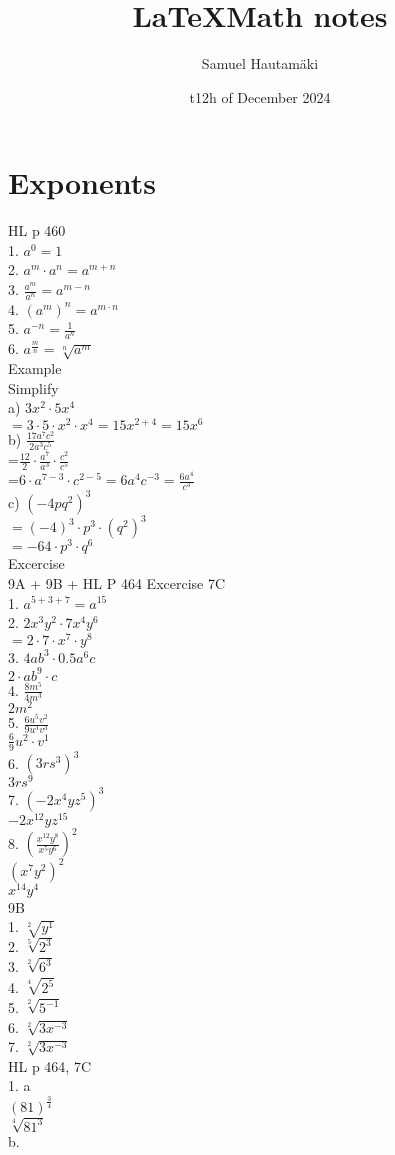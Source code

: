 \documentclass{article}
\title{\LaTeX Math notes}
\author{Samuel Hautamäki}
\date{t12h of December 2024}
\begin{document}
  \maketitle
   
  \section{Exponents}
  HL p 460\\
  1. $a^0=1$\\
  2. $a^m\cdot a^n=a^{m+n}$\\
  3. $\frac{a^m}{a^n}=a^{m-n}$\\
  4. $(a^m)^n=a^{m\cdot n}$\\
  5. $a^{-n}=\frac{1}{a^n}$\\
  6. $a^{\frac{m}{n}}=\sqrt[n]{a^m}$\\
  Example\\
  Simplify\\
  a) $3x^2\cdot 5x^4$\\
  $=3\cdot5\cdot x^2\cdot x^4=15x^{2+4}=15x^6$\\
  b) $\frac{17a^7c^2}{2a^3c^5}$\\
  =$\frac{12}{2}\cdot\frac{a^7}{a^3}\cdot\frac{c^2}{c^5}$\\
  =$6\cdot a^{7-3}\cdot c^{2-5}=6a^4c^{-3}=\frac{6a^4}{c^3}$\\
  c) $(-4pq^2)^3$\\
  $=(-4)^3\cdot p^3\cdot (q^2)^3$\\
  $=-64\cdot p^3\cdot q^6$\\
  Excercise \\
  9A + 9B + HL P 464 Excercise 7C\\
  1. $a^{5+3+7}=a^{15}$\\
  2. $2x^3y^2\cdot 7x^4y^6$\\
  $=2\cdot7\cdot x^7\cdot y^8$\\
  3. $4ab^3\cdot0.5a^6c$\\
  $2\cdot ab^{9}\cdot c$\\
  4. $\frac{8m^5}{4m^3}$\\
  $2m^{2}$\\
  5. $\frac{6u^5v^2}{9u^3v^3}$\\
  $\frac{6}{9}u^2\cdot v^1$\\
  6. $(3rs^3)^3$\\
  $3rs^9$\\
  7. $(-2x^4 yz^5)^3$\\
  $-2x^{12}yz^{15}$\\
  8. $(\frac{x^{12}y^8}{x^5y^6})^2$\\
  $(x^7y^2)^2$\\
  $x^{14}y^4$\\
  9B\\
  1. $\sqrt[2]{y^1}$\\
  2. $\sqrt[5]{2^3}$\\
  3. $\sqrt[2]{6^3}$\\
  4. $\sqrt[4]{2^5}$\\
  5. $\sqrt[2]{5^{-1}}$\\
  6. $\sqrt[2]{3x^{-3}}$\\
  7. $\sqrt[2]{3x^{-3}}$\\
  HL p 464, 7C\\
  1. a\\
  $(81)^\frac{3}{4}$\\ 
  $\sqrt[4]{81^3}$\\
  b. 


   
\end{document}
